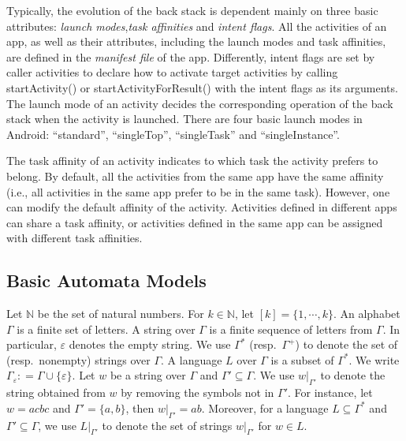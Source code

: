 \documentclass[preprint,12pt]{elsarticle}
\newcommand\natnum{{\mathbb{N} }}
\begin{document}
Typically, the evolution of the back stack is dependent mainly on three basic attributes: \emph{launch modes},\emph{task affinities} and \emph{intent flags}. All the activities of an app, as well as their attributes, including the launch modes and task affinities, are defined in the \emph{manifest file} of the app. Differently, intent flags are set by caller activities to declare how to activate target activities by calling startActivity() or startActivityForResult() with the intent flags as its arguments. The launch mode of an activity decides the corresponding operation of the back stack when the activity is launched. There are four basic launch modes in Android: ``standard'', ``singleTop'', ``singleTask'' and ``singleInstance''. 

The task affinity of an activity indicates to which task the activity prefers to belong. By default, all the activities from the same app have the same affinity (i.e., all activities in the same app prefer to be in the same task). However, one can modify the default affinity of the activity. Activities defined in different apps can share a task affinity, or activities defined in the same app can be assigned with different task affinities. 



\subsection{Basic Automata Models}

Let $\natnum$ be the set of natural numbers. For $k \in \natnum$, let $[k]=\{1,\cdots, k\}$. 
%
An alphabet $\Gamma$ is a finite set of letters.  A string over $\Gamma$ is a finite sequence of letters from $\Gamma$. In particular, $\varepsilon$ denotes %
the empty string. We use $\Gamma^*$ (resp.\ $\Gamma^+$) to denote the set of (resp.\ nonempty) strings over $\Gamma$. A language $L$ over $\Gamma$ is a  subset of $\Gamma^*$. We write $\Gamma_\varepsilon: = \Gamma \cup \{\varepsilon\}$. Let $w$ be a string over $\Gamma$ and $\Gamma' \subseteq \Gamma$. We use $w |_{\Gamma'}$ to denote the string obtained from $w$ by removing the symbols not in $\Gamma'$. For instance, let $w = a  c b c$ and $\Gamma' = \{a,b\}$, then $w|_{\Gamma'} = ab$. Moreover, for a language $L \subseteq \Gamma^*$ and $\Gamma' \subseteq \Gamma$, we use $L|_{\Gamma'}$ to denote the set of strings $w |_{\Gamma'}$ for $w \in L$. 
 
\end{document}
